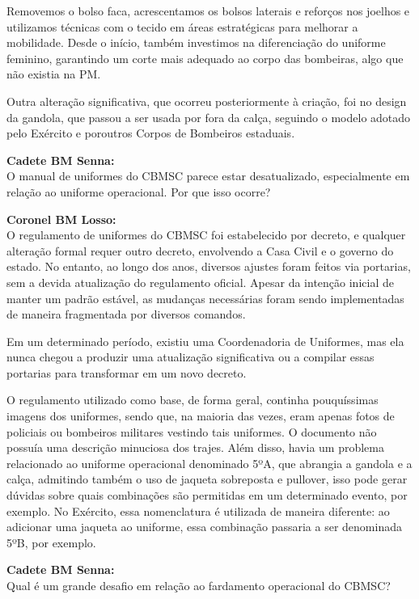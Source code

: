 \noindent Removemos o bolso faca, acrescentamos os bolsos laterais e reforços nos joelhos e utilizamos
técnicas com o tecido em áreas estratégicas para melhorar a mobilidade. Desde o início,
também investimos na diferenciação do uniforme feminino, garantindo um corte mais adequado
ao corpo das bombeiras, algo que não existia na PM.

\noindent Outra alteração significativa, que ocorreu posteriormente à criação, foi no design da gandola,
que passou a ser usada por fora da calça, seguindo o modelo adotado pelo Exército e poroutros Corpos de Bombeiros estaduais.

\noindent \textbf{Cadete BM Senna:} \\ O manual de uniformes do CBMSC parece estar desatualizado, especialmente em relação ao
uniforme operacional. Por que isso ocorre?

\noindent \textbf{Coronel BM Losso:} \\ O regulamento de uniformes do CBMSC foi estabelecido por decreto, e qualquer alteração
formal requer outro decreto, envolvendo a Casa Civil e o governo do estado. No entanto, ao
longo dos anos, diversos ajustes foram feitos via portarias, sem a devida atualização do
regulamento oficial. Apesar da intenção inicial de manter um padrão estável, as mudanças
necessárias foram sendo implementadas de maneira fragmentada por diversos comandos.

\noindent Em um determinado período, existiu uma Coordenadoria de Uniformes, mas ela nunca chegou
a produzir uma atualização significativa ou a compilar essas portarias para transformar em um
novo decreto.

\noindent O regulamento utilizado como base, de forma geral, continha pouquíssimas imagens dos
uniformes, sendo que, na maioria das vezes, eram apenas fotos de policiais ou bombeiros
militares vestindo tais uniformes. O documento não possuía uma descrição minuciosa dos
trajes. Além disso, havia um problema relacionado ao uniforme operacional denominado 5ºA,
que abrangia a gandola e a calça, admitindo também o uso de jaqueta sobreposta e pullover,
isso pode gerar dúvidas sobre quais combinações são permitidas em um determinado evento,
por exemplo. No Exército, essa nomenclatura é utilizada de maneira diferente: ao adicionar
uma jaqueta ao uniforme, essa combinação passaria a ser denominada 5ºB, por exemplo.

\noindent \textbf{Cadete BM Senna:} \\ Qual é um grande desafio em relação ao fardamento operacional do CBMSC?

